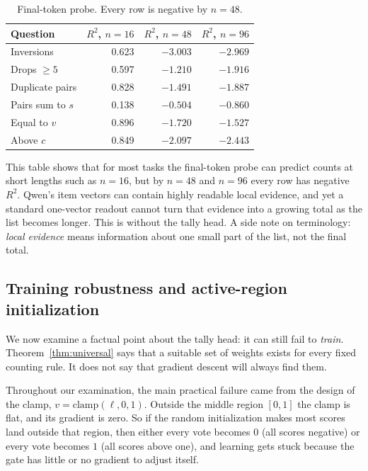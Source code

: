 \documentclass[10pt]{article}
\theoremstyle{definition}
\newcommand{\clampf}{\mathrm{clamp}}
\begin{document}
\begin{table}[htbp]
\centering
\caption{Final-token probe. Every row is negative by $n = 48$.}
\label{tab:probe2}
\begin{tabular}{@{}lrrr@{}}
\toprule
\textbf{Question} & \textbf{$R^2$, $n=16$} & \textbf{$R^2$, $n=48$} & \textbf{$R^2$, $n=96$} \\
\midrule
Inversions       & 0.623 & $-3.003$ & $-2.969$ \\
Drops $\geq 5$   & 0.597 & $-1.210$ & $-1.916$ \\
Duplicate pairs  & 0.828 & $-1.491$ & $-1.887$ \\
Pairs sum to $s$ & 0.138 & $-0.504$ & $-0.860$ \\
Equal to $v$     & 0.896 & $-1.720$ & $-1.527$ \\
Above $c$        & 0.849 & $-2.097$ & $-2.443$ \\
\bottomrule
\end{tabular}
\end{table}

This table shows that for most tasks the final-token probe can predict
counts at short lengths such as $n = 16$, but by $n = 48$ and $n = 96$
every row has negative $R^2$. Qwen's item vectors can contain highly
readable local evidence, and yet a standard one-vector readout cannot turn
that evidence into a growing total as the list becomes longer. This is
without the tally head. A side note on terminology: \emph{local evidence}
means information about one small part of the list, not the final total.

\subsection{Training robustness and active-region initialization}
\label{sec:robustness}

We now examine a factual point about the tally head: it can still fail to
\emph{train}. Theorem~\ref{thm:universal} says that a suitable set of
weights exists for every fixed counting rule. It does not say that
gradient descent will always find them.

Throughout our examination, the main practical failure came from the
design of the clamp, $v = \clampf(\ell, 0, 1)$. Outside the middle region
$[0,1]$ the clamp is flat, and its gradient is zero. So if the random
initialization makes most scores land outside that region, then either
every vote becomes $0$ (all scores negative) or every vote becomes $1$
(all scores above one), and learning gets stuck because the gate has
little or no gradient to adjust itself.
\end{document}

